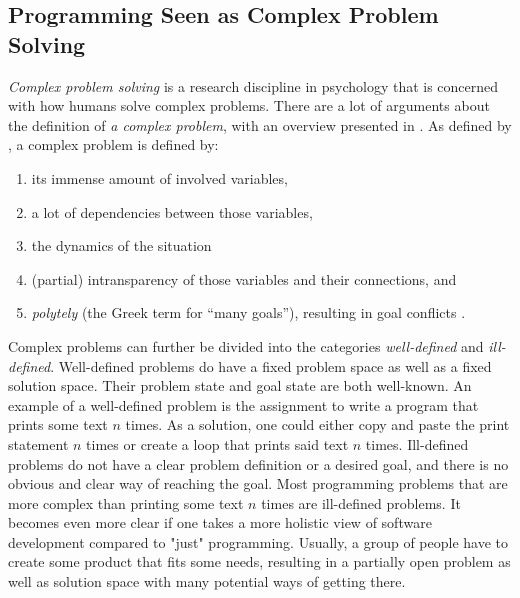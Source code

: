 \subsection{Programming Seen as Complex Problem Solving}
\label{sec:programming-as-complex-problem-solving}
\emph{Complex problem solving} is a research discipline in psychology that is concerned with how humans solve complex problems.
There are a lot of arguments about the definition of \emph{a complex problem}, with an overview presented in \cite{dorner_complex_2017}.
As defined by \citeauthor{funke_complex_2012}, a complex problem is defined by:
%
\begin{enumerate}
\item its immense amount of involved variables,
\item a lot of dependencies between those variables,
\item the dynamics of the situation
\item (partial) intransparency of those variables and their connections, and
\item \emph{polytely} (the Greek term for “many goals”), resulting in goal conflicts \cite{funke_complex_2012}.
\end{enumerate}
%
Complex problems can further be divided into the categories \emph{well-defined} and \emph{ill-defined}.
Well-defined problems do have a fixed problem space as well as a fixed solution space.
Their problem state and goal state are both well-known.
An example of a well-defined problem is the assignment to write a program that prints some text $n$ times.
As a solution, one could either copy and paste the print statement $n$ times or create a loop that prints said text $n$ times.
Ill-defined problems do not have a clear problem definition or a desired goal, and there is no obvious and clear way of reaching the goal.
Most programming problems that are more complex than printing some text $n$ times are ill-defined problems.
It becomes even more clear if one takes a more holistic view of software development compared to "just" programming.
Usually, a group of people have to create some product that fits some needs, resulting in a partially open problem as well as solution space with many potential ways of getting there.

